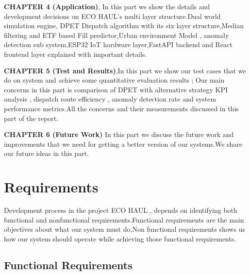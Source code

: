 \documentclass[12pt,a4paper]{report}
\begin{document}
\indent \textbf{CHAPTER 4 (Application)}, In this part we show the details and development decisions on ECO HAUL's multi layer structure.Dual world simulation engine, DPET Dispatch algorithm with its six layer structure,Median filtering and ETF based Fill predictor,Urban environment Model , anomaly detection sub system,ESP32 IoT hardware layer,FastAPI backend and React frontend layer explained with important details.


\indent \textbf {CHAPTER 5 (Test and Results)},In this part we show our test cases that we do on system and achieve some quantitative evaluation results ; Our main concerns in this part is comparison of DPET with alternative strategy  KPI analysis , dispatch route efficiency , anomaly detection rate and system performance metrics.All the concerns and their measurements discussed in this part of the report.

\indent  \textbf{CHAPTER 6 (Future Work)}
In this part we discuss the future work and improvements that we need for getting a better version of our systems.We share our future ideas in this part.

\section{Requirements}

\indent Development process in the project ECO HAUL , depends on identifying both functional and nonfunctional  requirements.Functional requirements are the main objectives about what our system must do,Non functional requirements shows us how our system should operate while achieving those functional requirements.
\subsection{Functional Requirements}
\end{document}
